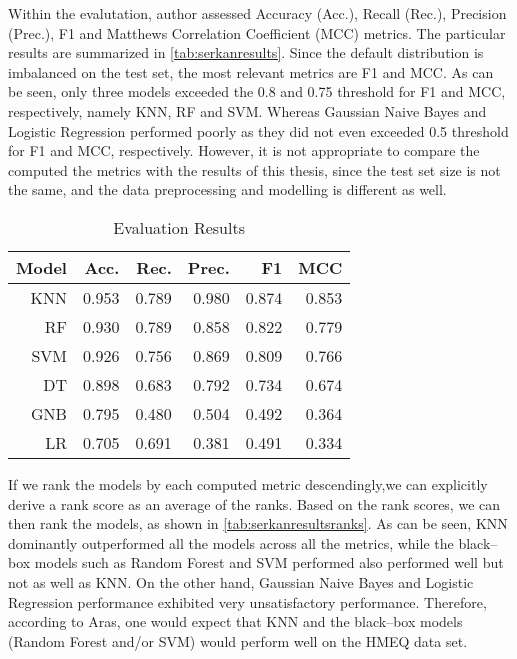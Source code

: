Within the evalutation, author assessed Accuracy (Acc.), Recall (Rec.), Precision (Prec.), F1 and Matthews Correlation Coefficient (MCC) metrics. The particular results are summarized in \autoref{tab:serkanresults}.
Since the default distribution is imbalanced on the test set, the most relevant metrics are F1 and MCC.
As can be seen, only three models exceeded the 0.8 and 0.75 threshold for F1 and MCC, respectively, namely KNN, RF and SVM. Whereas Gaussian Naive Bayes and Logistic Regression performed poorly as they did not even exceeded 0.5 threshold for F1 and MCC, respectively.
However, it is not appropriate to compare the computed the metrics with the results of this thesis, since the test set size is not the same, and the data preprocessing and modelling is different as well.
\begin{table}[H]
    \small
    \setlength{\tabcolsep}{8pt}
    \renewcommand{\arraystretch}{1.3}
    \centering
    \caption[Evaluation Results \citep{serkan2021bagging}]{Evaluation Results \citep{serkan2021bagging}}\label{tab:serkanresults}
    \begin{tabular}{r r r r r r}
    \toprule
    \textbf{Model} & \textbf{Acc.} & \textbf{Rec.} & \textbf{Prec.} & \textbf{F1} & \textbf{MCC} \\
    \midrule
    \hline
	
	KNN & 0.953 & 0.789 & 0.980 & 0.874 & 0.853 \\
    RF & 0.930 & 0.789 & 0.858 & 0.822 & 0.779 \\
    SVM & 0.926 & 0.756 & 0.869 & 0.809 & 0.766 \\
    DT & 0.898 & 0.683 & 0.792 & 0.734 & 0.674 \\
    GNB & 0.795 & 0.480 & 0.504 & 0.492 & 0.364 \\
	LR & 0.705 & 0.691 & 0.381 & 0.491 & 0.334 \\
	
    \hline
    \bottomrule
    \end{tabular}
    \vspace{0.35em}
    
    \vspace{-1em}
\end{table}

If we rank the models by each computed metric descendingly,we can explicitly derive a rank score as an average of the ranks. Based on the rank scores, we can then rank the models, as shown in \autoref{tab:serkanresultsranks}. As can be seen, KNN dominantly outperformed all the models across all the metrics, while the black--box models such as Random Forest and SVM performed also performed well but not as well as KNN.
On the other hand, Gaussian Naive Bayes and Logistic Regression performance exhibited very unsatisfactory performance.
Therefore, according to Aras, one would expect that KNN and the black--box models (Random Forest and/or SVM) would perform well on the HMEQ data set.

